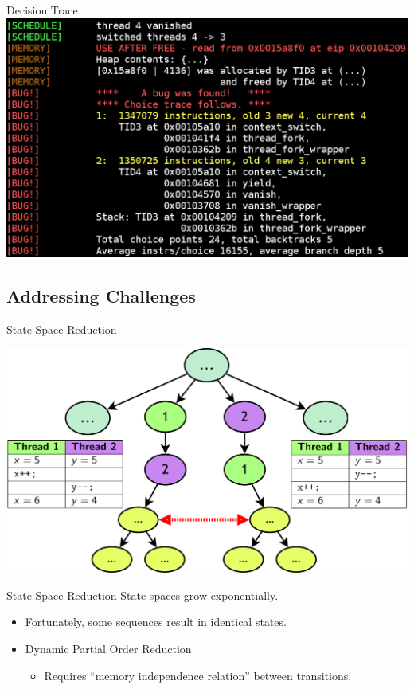 \documentclass[xcolor=dvipsnames]{beamer}
\begin{document}
\begin{frame}{Decision Trace}
	\includegraphics[width=\textwidth]{found_a_bug.png}
\end{frame}

\subsection{Addressing Challenges} %

\begin{frame}{State Space Reduction}
	\begin{center}
	\includegraphics[width=\textwidth]{undiamond1.png}
	\end{center}
\end{frame}
\begin{frame}{State Space Reduction}
	State spaces grow exponentially.
	\begin{itemize}
		\item Fortunately, some sequences result in identical states.
		\item Dynamic Partial Order Reduction
		\begin{itemize}
			\item Requires ``memory independence relation'' between transitions.
		\end{itemize}
	\end{itemize}
\end{frame}
\end{document}
